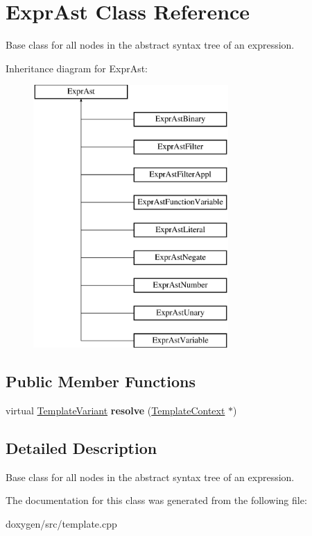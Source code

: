 \hypertarget{class_expr_ast}{}\section{Expr\+Ast Class Reference}
\label{class_expr_ast}


Base class for all nodes in the abstract syntax tree of an expression.  


Inheritance diagram for Expr\+Ast\+:\begin{figure}[H]
\begin{center}
\leavevmode
\includegraphics[height=10.000000cm]{class_expr_ast}
\end{center}
\end{figure}
\subsection*{Public Member Functions}
\begin{DoxyCompactItemize}
\item 
\mbox{\label{class_expr_ast_a45af2ff7084b61d66b5d764b458c3bd3}} 
virtual \mbox{\hyperlink{class_template_variant}{Template\+Variant}} {\bfseries resolve} (\mbox{\hyperlink{class_template_context}{Template\+Context}} $\ast$)
\end{DoxyCompactItemize}


\subsection{Detailed Description}
Base class for all nodes in the abstract syntax tree of an expression. 

The documentation for this class was generated from the following file\+:\begin{DoxyCompactItemize}
\item 
doxygen/src/template.\+cpp\end{DoxyCompactItemize}
